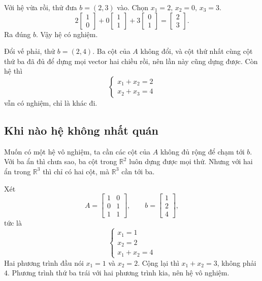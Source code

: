 \documentclass[12pt,a4paper]{article}
\begin{document}
Với hệ vừa rồi, thử đưa \(b=(2,3)\) vào. Chọn \(x_1=2,\,x_2=0,\,x_3=3\).
$$
2\left[ \begin{array}{r} 1\\ 0 \end{array} \right]
+0\left[ \begin{array}{r} 1\\ 1 \end{array} \right]
+3\left[ \begin{array}{r} 0\\ 1 \end{array} \right]
=\left[ \begin{array}{r} 2\\ 3 \end{array} \right].
$$
Ra đúng \(b\). Vậy hệ có nghiệm.

Đổi vế phải, thử \(b=(2,4)\). Ba cột của \(A\) không đổi, và cột thứ nhất cùng cột thứ ba đã đủ để dựng mọi vector hai chiều rồi, nên lần này cũng dựng được. Còn hệ thì
$$
\begin{cases}
x_1+x_2=2\\
x_2+x_3=4
\end{cases}
$$
vẫn có nghiệm, chỉ là khác đi.

\subsection{Khi nào hệ không nhất quán}

Muốn có một hệ vô nghiệm, ta cần các cột của \(A\) không đủ rộng để chạm tới \(b\). Với ba ẩn thì chưa sao, ba cột trong \(\mathbb R^2\) luôn dựng được mọi thứ. Nhưng với hai ẩn trong \(\mathbb R^3\) thì chỉ có hai cột, mà \(\mathbb R^3\) cần tới ba.

Xét
$$
A=\left[ \begin{array}{rr} 1&0\\ 0&1\\ 1&1 \end{array} \right],
\qquad
b=\left[ \begin{array}{r} 1\\ 2\\ 4 \end{array} \right],
$$
tức là
$$
\begin{cases}
x_1=1\\
x_2=2\\
x_1+x_2=4
\end{cases}
$$
Hai phương trình đầu nói \(x_1=1\) và \(x_2=2\). Cộng lại thì \(x_1+x_2=3\), không phải \(4\). Phương trình thứ ba trái với hai phương trình kia, nên hệ vô nghiệm.
\end{document}
